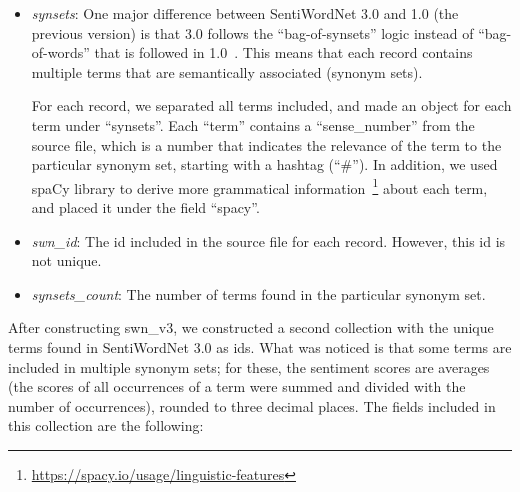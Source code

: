 \begin{itemize}
  \item \emph{synsets}: One major difference between SentiWordNet 3.0
  and 1.0 (the previous version) is
  that 3.0 follows the ``bag-of-synsets'' logic
  instead of ``bag-of-words'' that is followed in 1.0~\cite{BES10}.
  This means that each record contains multiple terms
  that are semantically associated (synonym sets).
  
  For each record, we separated all terms included,
  and made an object for each term under ``synsets''.
  Each ``term'' contains a ``sense\_number'' from the source file,
  which is a number that indicates the relevance of the term
  to the particular synonym set, starting with a hashtag (``\#'').
  In addition, we used spaCy library
  to derive more grammatical information~\footnote{\url {https://spacy.io/usage/linguistic-features}}
  about each term, and placed it under the field ``spacy''.
  
  \item \emph{swn\_id}: The id included in the source file for each record.
  However, this id is not unique.
  
  \item \emph{synsets\_count}: The number of terms
  found in the particular synonym set.
\end{itemize}

\label{subsubsubsec:english-sentiment-terms}

After constructing swn\_v3,
we constructed a second collection
with the unique terms found in SentiWordNet 3.0 as ids.
What was noticed is that some terms are included
in multiple synonym sets;
for these, the sentiment scores are averages
(the scores of all occurrences of a term were summed
and divided with the number of occurrences),
rounded to three decimal places.
The fields included in this collection are the following:

